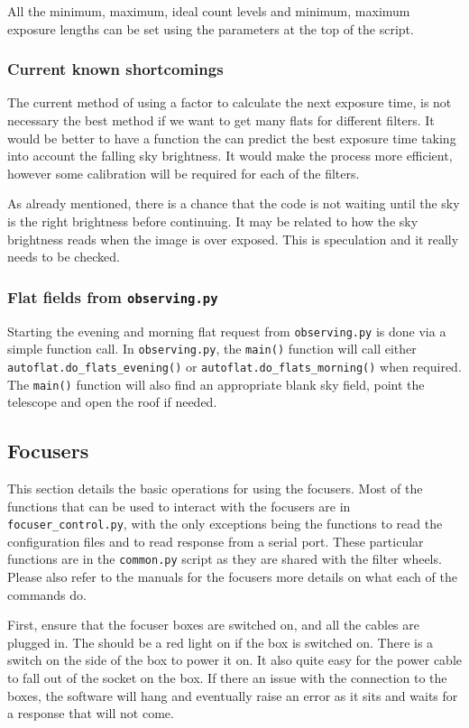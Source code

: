 \documentclass[a4paper,12pt]{article}
\newcommand{\observing}{\tt{observing.py}}
\begin{document}
All the minimum, maximum, ideal count levels and minimum, maximum exposure lengths can be set using the parameters at the top of the script.

\subsubsection{Current known shortcomings}

The current method of using a factor to calculate the next exposure time, is not necessary the best method if we want to get many flats for different filters. It would be better to have a function the can predict the best exposure time taking into account the falling sky brightness. It would make the process more efficient, however some calibration will be required for each of the filters.

As already mentioned, there is a chance that the code is not waiting until the sky is the right brightness before continuing. It may be related to how the sky brightness reads when the image is over exposed. This is speculation and it really needs to be checked.

\subsubsection{Flat fields from {\observing}}

Starting the evening and morning flat request from {\observing} is done via a simple function call. In {\observing}, the {\tt main()} function will call either {\tt autoflat.do\_flats\_evening()} or {\tt autoflat.do\_flats\_morning()} when required. The {\tt main()} function will also find an appropriate blank sky field, point the telescope and open the roof if needed.


\subsection{Focusers}
\label{sec:focusers}

This section details the basic operations for using the focusers. Most of the functions that can be used to interact with the focusers are in {\tt focuser\_control.py}, with the only exceptions being the functions to read the configuration files and to read response from a serial port. These particular functions are in the {\tt common.py} script as they are shared with the filter wheels. Please also refer to the manuals for the focusers more details on what each of the commands do.

First, ensure that the focuser boxes are switched on, and all the cables are plugged in. The should be a red light on if the box is switched on.  There is a switch on the side of the box to power it on. It also quite easy for the power cable to fall out of the socket on the box. If there an issue with the connection to the boxes, the software will hang and eventually raise an error as it sits and waits for a response that will not come.
\end{document}
